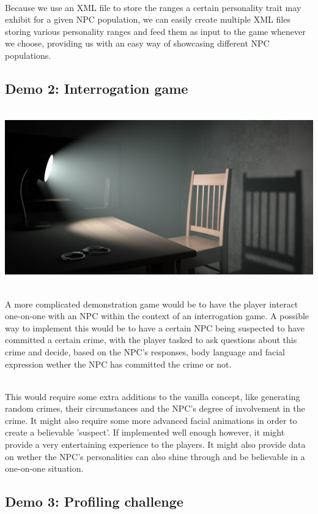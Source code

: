 \documentclass[11pt]{article} %
\begin{document}
~\\
Because we use an XML file to store the ranges a certain personality trait may exhibit for a given NPC population, we can easily create multiple XML files storing various personality ranges and feed them as input to the game whenever we choose, providing us with an easy way of showcasing different NPC populations.

\newpage
\subsection{Demo 2: Interrogation game}

~\\
\includegraphics[scale=0.7]{Interrogation}

~\\
A more complicated demonstration game would be to have the player interact one-on-one with an NPC within the context of an interrogation game. A possible way to implement this would be to have a certain NPC being suspected to have committed a certain crime, with the player tasked to ask questions about this crime and decide, based on the NPC's responses, body language and facial expression wether the NPC has committed the crime or not. 

~\\
This would require some extra additions to the vanilla concept, like generating random crimes, their circumstances and the NPC's degree of involvement in the crime. It might also require some more advanced facial animations in order to create a believable 'suspect'. If implemented well enough however, it might provide a very entertaining experience to the players. It might also provide data on wether the NPC's personalities can also shine through and be believable in a one-on-one situation.

\newpage
\subsection{Demo 3: Profiling challenge}
\end{document}
